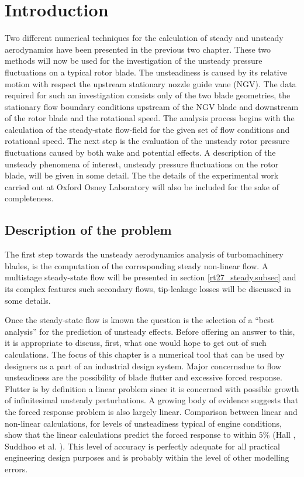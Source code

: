 %
%
%
%
\section{Introduction}
\label{rt27_introduction.sec}
%
 Two different numerical techniques
 for the calculation of steady and unsteady aerodynamics have been
 presented in the previous two chapter.
 These two methods will now be used for the investigation
 of the unsteady pressure fluctuations on a typical rotor blade.
 The unsteadiness is caused
 by its relative motion with respect the upstream stationary
 nozzle guide vane (NGV).
 The data required for such an investigation consists only of
 the two blade geometries, the stationary flow boundary
 conditions upstream of the NGV blade and downstream of the rotor blade and
 the rotational speed.
 The analysis process begins with the calculation
 of the steady-state flow-field for the given set of flow conditions
 and rotational speed.
 The next step is the evaluation of the unsteady rotor pressure
 fluctuations caused by both wake and potential effects.
 A description of the unsteady phenomena of interest, unsteady pressure
 fluctuations on the rotor blade, will be given in some detail.
 The the details of the experimental work carried out at Oxford
 Osney Laboratory will also be included for the sake
 of completeness.
%
%
%
\subsection{Description of the problem}
\label{rt27_description.sec}
%
 The first step towards the unsteady aerodynamics
 analysis of turbomachinery blades, is the computation
 of the corresponding steady non-linear flow.
 A multistage steady-state flow will be presented in section \ref{rt27_steady.subsec}
 and its complex features such secondary flows, tip-leakage losses
 will be discussed in some details.

 Once the steady-state flow is known the question is the selection
 of a ``best analysis'' for the prediction of unsteady effects.
 Before offering an answer to this, it is appropriate to discuss, first,
 what one would hope to get out of such calculations. The focus of this
 chapter is a numerical tool that can be used by
 designers as a part of an industrial design system.
 Major concernsdue to flow unsteadiness are the possibility
 of blade flutter and excessive forced response.
 Flutter is by definition a linear problem since it is concerned with
 possible growth of infinitesimal unsteady perturbations.
 A growing body of evidence suggests that the forced response problem is
 also largely linear. Comparison between linear and non-linear calculations,
 for levels of unsteadiness typical of engine conditions, show that the linear
 calculations predict the forced response to within $5\%$
 (Hall , Suddhoo et al. ).
 This level of accuracy is perfectly adequate for all practical engineering
 design purposes and is probably within the level of other modelling errors.

